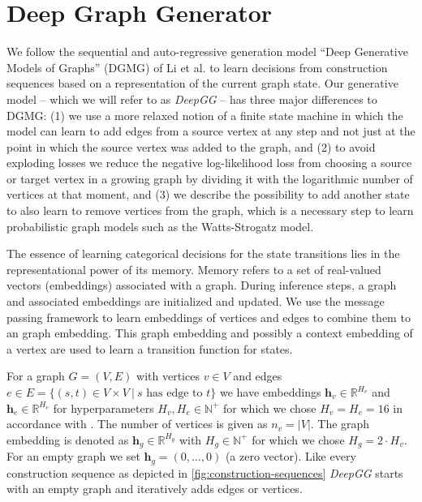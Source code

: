 \documentclass{article}
\begin{document}
 \section{Deep Graph Generator}\label{sec:deepgg}
We follow the sequential and auto-regressive generation model ``Deep Generative Models of Graphs'' (DGMG) of Li et al. \cite{li2018learning} to learn decisions from construction sequences based on a representation of the current graph state.
Our generative model -- which we will refer to as \textit{DeepGG} -- has three major differences to DGMG:
(1) we use a more relaxed notion of a finite state machine in which the model can learn to add edges from a source vertex at any step and not just at the point in which the source vertex was added to the graph, and
(2) to avoid exploding losses we reduce the negative log-likelihood loss from choosing a source or target vertex in a growing graph by dividing it with the logarithmic number of vertices at that moment, and
(3) we describe the possibility to add another state to also learn to remove vertices from the graph, which is a necessary step to learn probabilistic graph models such as the Watts-Strogatz model.

The essence of learning categorical decisions for the state transitions lies in the representational power of its memory.
Memory refers to a set of real-valued vectors (embeddings) associated with a graph.
During inference steps, a graph and associated embeddings are initialized and updated.
We use the message passing framework to learn embeddings of vertices and edges to combine them to an graph embedding.
This graph embedding and possibly a context embedding of a vertex are used to learn a transition function for states.

For a graph $G = (V, E)$ with vertices $v\in V$ and edges $e\in E = \{(s,t) \in V\times V ~|~ s \text{ has edge to } t\}$ we have embeddings $\boldsymbol{h}_v\in\mathbb{R}^{H_v}$ and $\boldsymbol{h}_e\in\mathbb{R}^{H_e}$ for hyperparameters $H_v, H_e \in\mathbb{N}^+$ for which we chose $H_v = H_e = 16$ in accordance with \cite{li2018learning}.
The number of vertices is given as $n_v = |V|$.
The graph embedding is denoted as $\boldsymbol{h}_g\in\mathbb{R}^{H_g}$ with $H_g\in\mathbb{N}^+$ for which we chose $H_g = 2\cdot H_v$.
For an empty graph we set $\boldsymbol{h}_g = (0,\dots,0)$ (a zero vector).
Like every construction sequence as depicted in \autoref{fig:construction-sequences} \textit{DeepGG} starts with an empty graph and iteratively adds edges or vertices.
\end{document}
